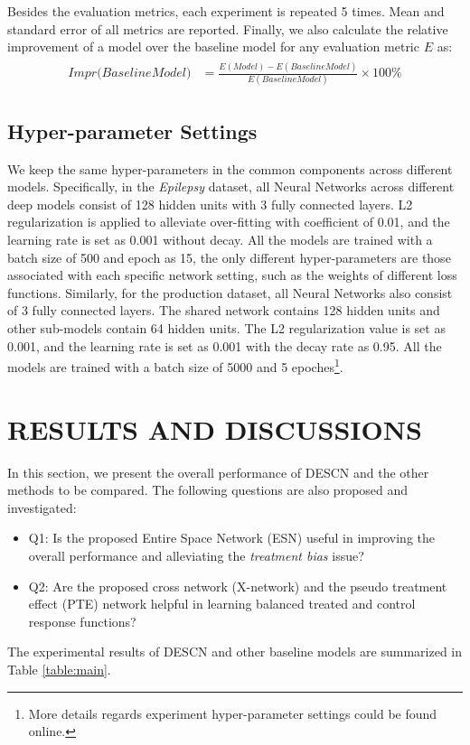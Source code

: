 \documentclass[sigconf]{acmart}
\begin{document}
Besides the evaluation metrics, each experiment is repeated 5 times. Mean and standard error of all metrics are reported. Finally, we also calculate the relative improvement of a model over the baseline model for any evaluation metric $E$ as:
\begin{align}
    \label{impr}
    \begin{aligned}
    \textit{Impr(BaselineModel)} &= \frac{E(Model) - E(BaselineModel)}{E(BaselineModel)} \times 100\%
    \end{aligned}
\end{align}

\subsection{Hyper-parameter Settings}
We keep the same hyper-parameters in the common components across different models. Specifically, in the \textit{Epilepsy} dataset, all Neural Networks across different deep models consist of 128 hidden units with 3  fully connected layers. L2 regularization is applied to alleviate over-fitting with coefficient of 0.01, and the learning rate is set as 0.001 without decay. All the models are trained with a batch size of 500 and epoch as 15, the only different hyper-parameters are those associated with each specific network setting, such as the weights of different loss functions. Similarly, for the production dataset, all Neural Networks also consist of 3 fully connected layers. The shared network contains 128 hidden units and other sub-models contain 64 hidden units. The L2 regularization value is set as 0.001, and the learning rate is set as 0.001 with the decay rate as 0.95. All the models are trained with a batch size of 5000 and 5 epoches\footnote{More details regards experiment hyper-parameter settings could be found online.}.



\section{RESULTS AND DISCUSSIONS}
In this section, we present the overall performance of DESCN and the other methods to be compared. The following questions are also proposed and investigated:
\begin{itemize}
	\item Q1: Is the proposed Entire Space Network (ESN) useful in improving the overall performance and alleviating the \textit{treatment bias} issue? 
	\item Q2: Are the proposed cross network (X-network) and the pseudo treatment effect (PTE) network helpful in learning balanced treated and control response functions?
\end{itemize}
The experimental results of DESCN and other baseline models are summarized in Table \ref{table:main}.
\end{document}
